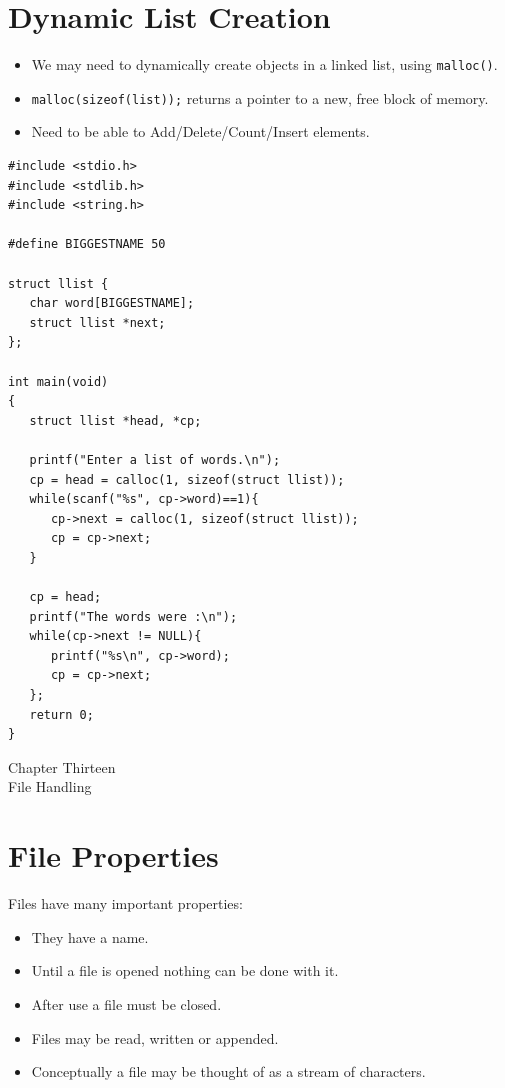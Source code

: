 \documentclass[a4,portraitt]{slides}
\begin{document}
\newpage
\section*{Dynamic List Creation}
\begin{itemize}
\item We may need to dynamically create objects in a linked
list, using \verb^malloc()^.
\item \verb^malloc(sizeof(list));^ returns a pointer
to a new, free block of memory.
\item Need to be able to Add/Delete/Count/Insert elements.
\end{itemize}

\newpage
{\samepage
{\small
\begin{verbatim}
#include <stdio.h>
#include <stdlib.h>
#include <string.h>

#define BIGGESTNAME 50

struct llist {
   char word[BIGGESTNAME];
   struct llist *next;
};

int main(void)
{
   struct llist *head, *cp;

   printf("Enter a list of words.\n");
   cp = head = calloc(1, sizeof(struct llist));
   while(scanf("%s", cp->word)==1){
      cp->next = calloc(1, sizeof(struct llist));
      cp = cp->next;
   }

   cp = head;
   printf("The words were :\n");
   while(cp->next != NULL){
      printf("%s\n", cp->word);
      cp = cp->next;
   };
   return 0;
}
\end{verbatim}
}}

\newpage
\begin{center}
{\Large Chapter Thirteen\\ File Handling}
\end{center}
\section*{File Properties}
Files have many important properties:
\begin{itemize}
\item They have a name.
\item Until a file is opened nothing can be done with it.
\item After use a file must be closed.
\item Files may be read, written or appended.
\item Conceptually a file may be thought of as a stream of characters.
\end{itemize}
\end{document}
